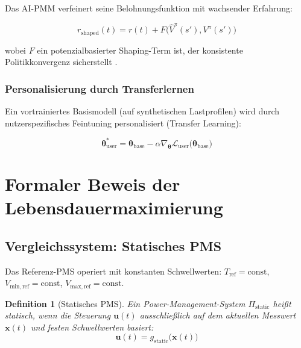 ﻿\documentclass[12pt,a4paper]{article}
\newtheorem{definition}{Definition}[section]
\begin{document}
	Das AI-PMM verfeinert seine Belohnungsfunktion mit wachsender Erfahrung:
	
	\begin{equation}
		r_\mathrm{shaped}(t) = r(t) + F\bigl(\hat{V}^\pi(s'), V^\pi(s')\bigr)
		\label{eq:reward_shaping}
	\end{equation}
	
	wobei $F$ ein potenzialbasierter Shaping-Term ist, der konsistente
	Politikkonvergenz sicherstellt \cite{Ng1999}.
	
	\subsubsection{Personalisierung durch Transferlernen}
	
	Ein vortrainiertes Basismodell (auf synthetischen Lastprofilen) wird durch
	nutzerspezifisches Feintuning personalisiert (Transfer Learning):
	
	\begin{equation}
		\boldsymbol{\theta}^*_\mathrm{user} = \boldsymbol{\theta}_\mathrm{base}
		- \alpha \nabla_{\boldsymbol{\theta}} \mathcal{L}_\mathrm{user}
		\bigl(\boldsymbol{\theta}_\mathrm{base}\bigr)
		\label{eq:fine_tuning}
	\end{equation}
	
	\section{Formaler Beweis der Lebensdauermaximierung}
	\label{sec:beweis}
	
	\subsection{Vergleichssystem: Statisches PMS}
	
	Das Referenz-PMS operiert mit konstanten Schwellwerten:
	$T_\mathrm{ref} = \mathrm{const}$, $V_\mathrm{min,ref} = \mathrm{const}$,
	$V_\mathrm{max,ref} = \mathrm{const}$.
	
	\begin{definition}[Statisches PMS]
		Ein Power-Management-System $\Pi_\mathrm{static}$ heißt statisch, wenn
		die Steuerung $\mathbf{u}(t)$ ausschließlich auf dem aktuellen Messwert
		$\mathbf{x}(t)$ und festen Schwellwerten basiert:
		\begin{equation}
			\mathbf{u}(t) = g_\mathrm{static}\bigl(\mathbf{x}(t)\bigr)
		\end{equation}
	\end{definition}
	
\end{document}
